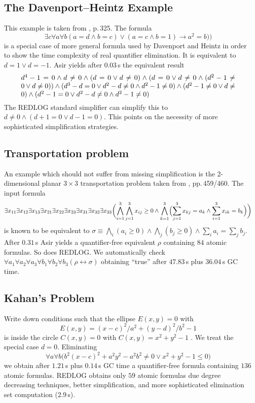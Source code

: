 \subsection{The Davenport--Heintz Example}
This example is taken from \cite{CollinsHong:91}, p.\,325. The formula
$$
\exists c \forall a \forall b(a=d \land b=c) \lor (a=c \land b=1)
\longrightarrow a^2=b))
$$
is a special case of more general formula used by Davenport and Heintz
\cite{Davenport:88} in order to show the time complexity of real
quantifier elimination. It is equivalent to $d=1\lor d=-1$. Asir
yields after $0.03$\,s the equivalent result
$$
\vbox{\hsize=0.9\textwidth\noindent$d^{4} - 1 = 0 \land d \neq 0 \land
(d = 0 \lor d \neq 0) \land (d= 0 \lor d \neq 0 \land (d^{2} - 1 \neq
0 \lor d \neq 0)) \land (d^{3} - d = 0 \lor d^{2}- d \neq 0 \land
d^{2} - 1 \neq 0) \land (d^{2} - 1 \neq 0 \lor d \neq 0) \land (d^{2} -
1 = 0 \lor d^{2} - d \neq 0 \land d^{2} - 1 \neq 0)$}
$$
The REDLOG standard simplifier can simplify this to $d \neq 0 \land (d
+ 1= 0 \lor d - 1 = 0)$. This points on the necessity of more
sophisticated simplification strategies.
%
\subsection{Transportation problem}
An example which should not suffer from missing simplification is the
2-dimensional planar $3\times 3$ transportation problem taken from
\cite{LoosWeispfenning:93}, pp.\,459/460. The input formula
$$
\exists x_{11}\exists x_{12}\exists x_{13}\exists x_{21}\exists
x_{22}\exists x_{23}\exists x_{31}\exists x_{32}\exists x_{33}\biggl(
\bigwedge_{i=1}^3\bigwedge_{j=1}^3 x_{ij}\geq0\land
\bigwedge_{k=1}^3\Bigl(\sum_{j=1}^3 x_{kj}=a_k\land \sum_{i=1}^3
x_{ik}=b_k\Bigr) \biggr)
$$
is known to be equivalent to $\sigma\equiv\bigwedge_i (a_i\geq0) \land
\bigwedge_j (b_j\geq0) \land \sum_i a_i=\sum_j b_j$. After $0.31$\,s
Asir yields a quantifier-free equivalent $\rho$ containing $84$ atomic
formulas. So does REDLOG. We automatically check $\forall a_1\forall
a_2\forall a_3\forall b_1\forall b_2 \forall
b_3(\rho\longleftrightarrow\sigma)$ obtaining ``true'' after
$47.83$\,s plus $36.04$\,s GC time.
%
\subsection{Kahan's Problem}
Write down conditions such that the ellipse $E(x,y)=0$ with
$$
E(x,y)=(x-c)^2/a^2+(y-d)^2/b^2-1
$$
is inside the circle $C(x,y)=0$ with $C(x,y)=x^2+y^2-1$
\cite{Lazard:88}. We treat the special case $d=0$. Eliminating
$$
\forall a\forall b\bigl(b^2 (x-c)^2+a^2 y^2-a^2 b^2 \neq 0 \lor
x^2+y^2-1 \leq 0\bigr)
$$
we obtain after $1.21$\,s plus $0.14$\,s GC time a quantifier-free formula 
containing $136$ atomic formulas. REDLOG obtains only $59$ atomic
formulas due degree decreasing techniques, better simplification, and
more sophisticated elimination set computation ($2.9$\,s).
%
